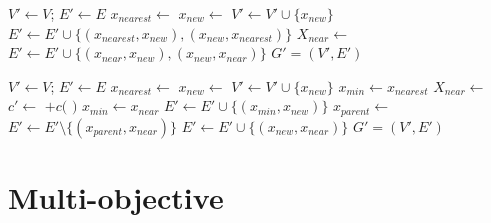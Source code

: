 \documentclass[paper=a4, fontsize=11pt]{scrartcl}
\begin{document}
\begin{algorithm}
\begin{algorithmic}[1]
\State $ V' \leftarrow V $; $ E' \leftarrow E $
\State $ x_{nearest} \leftarrow $ 
\State $ x_{new} \leftarrow $ 
\State $ V' \leftarrow V' \cup \{ x_{new} \} $
\State $ E' \leftarrow E' \cup \{ ( x_{nearest} , x_{new} ) , ( x_{new} , x_{nearest} ) \} $
\State $ X_{near} \leftarrow $ 
$ E' \leftarrow E' \cup \{ ( x_{near}, x_{new} ) , ( x_{new} , x_{near} ) \} $
\EndIf
\EndFor
\EndIf
\Return $ G' = (V', E') $ 
\end{algorithmic}
\label{alg:rrg_extend}
\caption{ $ \mbox{Extend}_{RRG} (G, x) $}
\end{algorithm}

\begin{algorithm}
\begin{algorithmic}[1]
\State $ V' \leftarrow V $; $ E' \leftarrow E $
\State $ x_{nearest} \leftarrow $ 
\State $ x_{new} \leftarrow $ 
\State $ V' \leftarrow V' \cup \{ x_{new} \} $
\State $ x_{min} \leftarrow x_{nearest} $
\State $ X_{near} \leftarrow $ 
\State $ c' \leftarrow $  $ + c( $  $ ) $ 
\State $ x_{min} \leftarrow x_{near} $
\EndIf
\EndIf
\EndFor
\State $ E' \leftarrow E' \cup \{ ( x_{min}, x_{new} ) \} $
\EndIf
{}
\State $ x_{parent} \leftarrow $ 
\State $ E' \leftarrow E' \setminus \{ ( x_{parent}, x_{near} ) \} $
\State $ E' \leftarrow E' \cup \{ ( x_{new}, x_{near} ) \} $
\EndIf
\EndFor
\Return $ G' = (V', E') $ 
\end{algorithmic}
\label{alg:rrtstar_extend}
\caption{ $ \mbox{Extend}_{RRT^{*}} (G, x) $}
\end{algorithm}

\section{Multi-objective}




\end{document}
